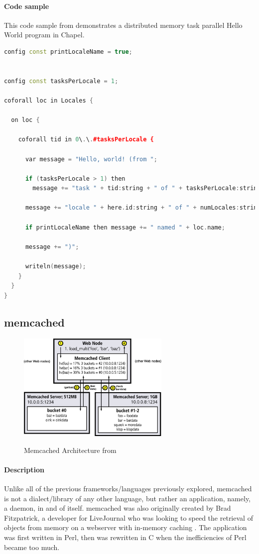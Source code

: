 	\paragraph{Code sample}
	This code sample from \cite{chapel_github} demonstrates a distributed memory task parallel Hello World program in Chapel.
		
	\begin{lstlisting}[language=C++, caption=Hello World in Chapel, captionpos=b]
config const printLocaleName = true;


config const tasksPerLocale = 1;

coforall loc in Locales {

  on loc {

    coforall tid in 0\.\.#tasksPerLocale {

      var message = "Hello, world! (from ";

      if (tasksPerLocale > 1) then
        message += "task " + tid:string + " of " + tasksPerLocale:string + " on ";

      message += "locale " + here.id:string + " of " + numLocales:string;

      if printLocaleName then message += " named " + loc.name;

      message += ")";

      writeln(message);
    }
  }
}
	\end{lstlisting}

\subsection{memcached}
    \begin{figure}[h]
		\centering
		\includegraphics[width=0.65\textwidth]{Figures/memcached_arch.jpg}
        \label{fig:chapel_arch}
		\caption{Memcached Architecture from \cite{memcached_linux}}
    \end{figure}
	\paragraph{Description}
	Unlike all of the previous frameworks/languages previously explored, memcached is not a dialect/library of any other language, but rather an application, namely, a daemon, in and of itself. memcached was also originally created by Brad Fitzpatrick, a developer for LiveJournal who was looking to speed the retrieval of objects from memory on a webserver with in-memory caching \cite{lj_dev}. The application was first written in Perl, then was rewritten in C when the inefficiencies of Perl became too much.

